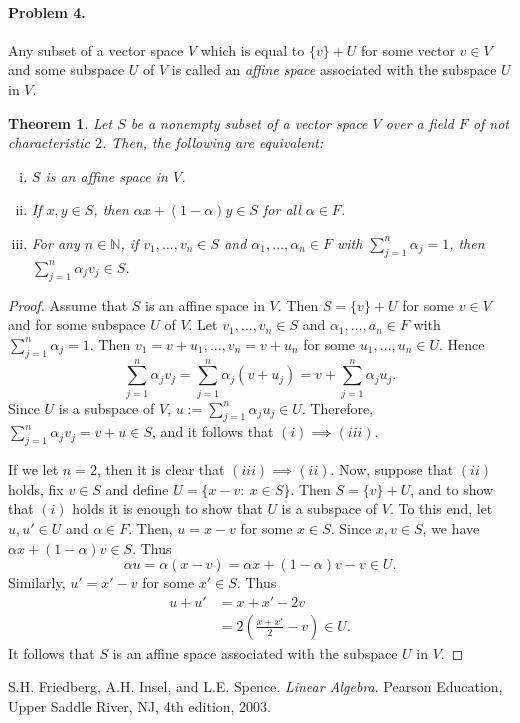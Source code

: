 \documentclass{article}
\newtheorem{theorem}{Theorem}
\begin{document}
\paragraph*{Problem 4.}	Any subset of a vector space $V$ which is equal to $\{v\}+U$ for some vector $v\in V$ and some subspace $U$ of $V$ is called an \emph{affine space} associated with the subspace $U$ in $V$.
\begin{theorem}
Let $S$ be a nonempty subset of a vector space $V$ over a field $F$ of not characteristic $2$. Then, the following are equivalent:
\begin{enumerate}[(i)]
\item	$S$ is an affine space in $V$.
\item	If $x,y\in S$, then $\alpha x+(1-\alpha)y\in S$ for all $\alpha\in F$. 
\item	For any $n\in\mathbb{N}$, if $v_{1},\ldots,v_{n}\in S$ and $\alpha_{1},\ldots,\alpha_{n}\in F$ with $\sum_{j=1}^{n}\alpha_{j}=1$, then $\sum_{j=1}^{n}\alpha_{j}v_{j}\in S$. 
\end{enumerate}
\end{theorem}
\begin{proof}
Assume that $S$ is an affine space in $V$. Then $S=\{v\}+U$ for some $v\in V$ and for some subspace $U$ of $V$. Let $v_{1},\ldots,v_{n}\in S$ and $\alpha_{1},\ldots,a_{n}\in F$ with $\sum_{j=1}^{n}\alpha_{j}=1$. Then $v_{1}=v+u_{1},\ldots,v_{n}=v+u_{n}$ for some $u_{1},\ldots,u_{n}\in U$. Hence
\[
\sum_{j=1}^{n}\alpha_{j}v_{j}=\sum_{j=1}^{n}\alpha_{j}(v+u_{j})=v+\sum_{j=1}^{n}\alpha_{j}u_{j}.
\]
Since $U$ is a subspace of $V$, $u:=\sum_{j=1}^{n}\alpha_{j}u_{j}\in U$. Therefore, $\sum_{j=1}^{n}\alpha_{j}v_{j}=v+u\in S$, and it follows that $(i)\implies(iii)$. 

If we let $n=2$, then it is clear that $(iii)\implies(ii)$. Now, suppose that $(ii)$ holds, fix $v\in S$ and define $U=\{x-v\colon~x\in S\}$. Then $S=\{v\}+U$, and to show that $(i)$ holds it is enough to show that $U$ is a subspace of $V$. To this end, let $u,u'\in U$ and $\alpha\in F$. Then, $u=x-v$ for some $x\in S$. Since $x,v\in S$, we have $\alpha x + (1-\alpha)v\in S$. Thus
\[
\alpha u = \alpha(x-v) = \alpha x +(1-\alpha)v -v\in U.
\]
Similarly, $u'=x'-v$ for some $x'\in S$. Thus
\begin{align*}
u+u'&=x+x'-2v \\
&=2(\frac{x+x'}{2}-v)\in U.
\end{align*}
It follows that $S$ is an affine space associated with the subspace $U$ in $V$. 

\end{proof}
\begin{thebibliography}{9}
S.H. Friedberg, A.H. Insel, and L.E. Spence.
\textit{Linear Algebra}.
Pearson Education, Upper Saddle River, NJ, 4th edition, 2003.
\end{thebibliography}
\end{document}
